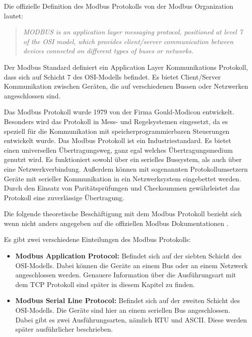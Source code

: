 Die offizielle Definition des Modbus Protokolls von der Modbus Organization \cite{Modbus_Organization_AP:2012} lautet:
\begin{quotation}
	\emph{
		MODBUS is an application layer messaging protocol, positioned at level 7 of the OSI model, which provides client/server communication between devices connected on different types of buses or networks.}
\end{quotation}

Der Modbus Standard definiert ein Application Layer Kommunikations Protokoll, dass sich auf Schicht 7 des OSI-Modells befindet. Es bietet Client/Server Kommunikation zwischen Geräten, die auf verschiedenen Bussen oder Netzwerken angeschlossen sind.

Das Modbus Protokoll wurde 1979 von der Firma Gould-Modicon entwickelt. Besonders wird das Protokoll in Mess- und Regelsystemen eingesetzt, da es speziell für die Kommunikation mit speicherprogrammierbaren Steuerungen entwickelt wurde. Das Modbus Protokoll ist ein Industriestandard. Es bietet einen universellen Übertragungsweg, ganz egal welches Übertragungsmedium genutzt wird. Es funktioniert sowohl über ein serielles Bussystem, als auch über eine Netzwerkverbindung. Außerdem können mit sogenannten Protokollumsetzern Geräte mit serieller Kommunikation in ein Netzwerksystem eingebettet werden. Durch den Einsatz von Paritätsprüfungen und Checksummen gewährleistet das Protokoll eine zuverlässige Übertragung. \cite{KUNBUS_GmbH:o.J., kvm-concepts_GmbH:2022}


Die folgende theoretische Beschäftigung mit dem Modbus Protokoll bezieht sich wenn nicht anders angegeben auf die offiziellen Modbus Dokumentationen \cite{Modbus_Organization_AP:2012, Modbus_Organization_SL:2012}. 

Es gibt zwei verschiedene Einteilungen des Modbus Protokolls: 
\begin{itemize}
\item \textbf{Modbus Application Protocol:} Befindet sich auf der siebten Schicht des OSI-Modells. Dabei können die Geräte an einem Bus oder an einem Netzwerk angeschlossen werden. Genauere Information über die Ausführungsart mit dem TCP Protokoll sind später in diesem Kapitel zu finden.
\item \textbf{Modbus Serial Line Protocol:} Befindet sich auf der zweiten Schicht des OSI-Modells. Die Geräte sind hier an einem seriellen Bus angeschlossen. Dabei gibt es zwei Ausführungsarten, nämlich RTU und ASCII. Diese werden später ausführlicher beschrieben.
\end{itemize}

